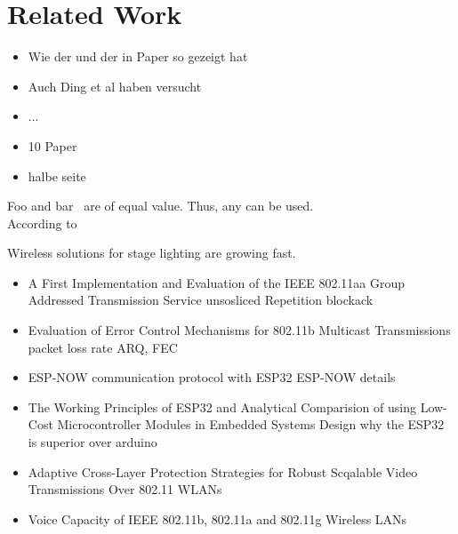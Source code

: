 
\chapter{Related Work}
\begin{itemize}
	\item Wie der und der in Paper so gezeigt hat 
	\item Auch Ding et al haben versucht
	\item ...
	\item 10 Paper
	\item halbe seite
\end{itemize}

Foo and bar~\cite{LowCostMicrocontroller} are of equal value. Thus, any can be used.\\
According to~\cite{akyildiz2002survey}

Wireless solutions for stage lighting are growing fast. 

\begin{itemize}
	\item A First Implementation and Evaluation of the IEEE 802.11aa Group Addressed Transmission Service    
		\subitem unsosliced Repetition
		\subitem blockack
	\item Evaluation of Error Control Mechanisms for 802.11b Multicast Transmissions
		\subitem packet loss rate
		\subitem ARQ, FEC
	\item ESP-NOW communication protocol with ESP32
		\subitem ESP-NOW details
	\item The Working Principles of ESP32 and Analytical Comparision of using Low-Cost Microcontroller Modules in Embedded Systems Design
		\subitem why the ESP32 is superior over arduino
	\item Adaptive Cross-Layer Protection Strategies for Robust Scqalable Video Transmissions Over 802.11 WLANs
	\item Voice Capacity of IEEE 802.11b, 802.11a and 802.11g Wireless LANs
\end{itemize}




